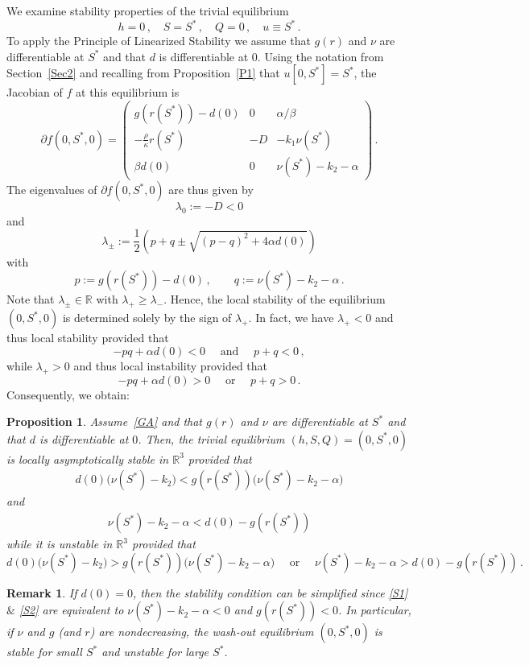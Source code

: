 \documentclass[reqno,11pt]{amsart}
\newtheorem{prop}[thm]{Proposition}
\newtheorem{rem}[thm]{Remark}
\numberwithin{equation}{section}
\newcommand{\R}{\mathbb{R}}
\begin{document}
We examine  stability properties of the trivial equilibrium
$$
h=0\,,\quad S=S^*\,,\quad Q=0\,,\quad u\equiv S^*\,.
$$
To apply the Principle of Linearized Stability we assume that $g(r)$ and $\nu$ are differentiable at $S^*$ and that  $d$ is differentiable at $0$. Using the notation from Section~\ref{Sec2} and recalling from Proposition~\ref{P1} that $u[0,S^*]=S^*$, the Jacobian of $f$ at this equilibrium is
\begin{equation*}
\partial f(0,S^*,0)=\left(\begin{matrix}
g(r(S^*))-d(0) & 0 & \alpha/\beta\\[4pt]
-\frac{\rho}{\kappa}r(S^*) & -D & -k_1 \nu(S^*)\\[4pt]
\beta d(0) & 0& \nu(S^*)-k_2-\alpha
\end{matrix}\right)\,.
\end{equation*}
The eigenvalues of $\partial f(0,S^*,0)$ are thus given by
$$
\lambda_0:=-D<0
$$
and
$$
\lambda_\pm:=\frac{1}{2}\left(p+q \pm\sqrt{ (p-q)^2+4\alpha d(0)}\right)
$$
with 
$$
p:=g(r(S^*))-d(0) \,,\qquad q:=\nu(S^*)-k_2-\alpha\,.
$$
Note that $\lambda_\pm\in\R$ with $\lambda_+\geq \lambda_-$.
Hence, the local stability of the equilibrium $(0,S^*,0)$ is determined solely by the sign of $\lambda_+$.  %
In fact, we have $\lambda_+<0$
and thus local stability provided that
$$
-pq+\alpha d(0)< 0 \quad \text{ and }\quad p+q<0\,,
$$
while
$\lambda_+ >0$
and thus local instability provided that
$$
-pq+\alpha d(0)>0 \quad \text{ or }\quad p+q>0\,.
$$
Consequently, we obtain:

\begin{prop}\label{P2}
Assume~\eqref{GA} and that $g(r)$ and $\nu$ are differentiable at $S^*$ and that  $d$ is differentiable at $0$. Then, the trivial equilibrium $(h,S,Q)=(0,S^*,0)$ is locally asymptotically stable in $\R^3$ provided that
\begin{align}\label{S1}
d(0)\Big( \nu(S^*)-k_2\Big)<g(r(S^*))\Big(\nu(S^*)-k_2-\alpha\Big)\tag{S1} 
\end{align}
and
\begin{align}\label{S2}
\nu(S^*)-k_2-\alpha<d(0)-g(r(S^*))  \tag{S2}
\end{align}
while it is unstable in $\R^3$ provided that
$$
d(0)\big( \nu(S^*)-k_2\big)> g(r(S^*))\big(\nu(S^*)-k_2-\alpha\big)\quad \text{ or }\quad \nu(S^*)-k_2-\alpha > d(0)-g(r(S^*)) \,.
$$
\end{prop}


\begin{rem}\label{R1}
If $d(0)=0$, then the stability condition can be simplified since \eqref{S1} $\&$ \eqref{S2}  are equivalent to  $\nu(S^*)-k_2-\alpha<0$ and $g(r(S^*))< 0$. In particular, if $\nu$ and $g$ (and $r$) are nondecreasing, the wash-out equilibrium $(0,S^*,0)$ is stable for small $S^*$ and unstable for large $S^*$.
\end{rem}
\end{document}

